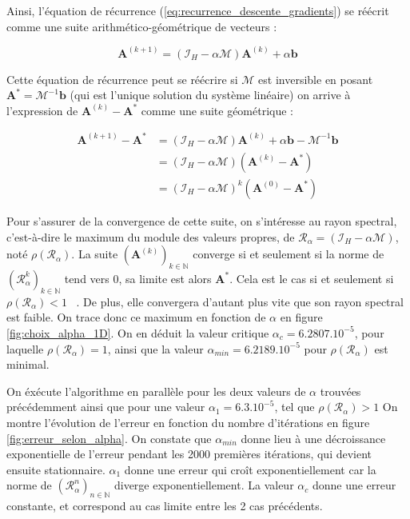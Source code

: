 \documentclass[12pt]{report}
\begin{document}
Ainsi, l'équation de récurrence (\ref{eq:recurrence_descente_gradients}) se réécrit comme une suite arithmético-géométrique de vecteurs :

\begin{equation}
    \bm{A}^{(k+1)} = (\mathcal{I}_H - \alpha \mathcal{M} )  \bm{A}^{(k)} + \alpha\bm{b}
    \label{eq:recurrence_descente_gradients_v2}
\end{equation}

Cette équation de récurrence peut se réécrire si $\mathcal M$ est inversible en posant $\bm{A^*} = \mathcal {M}^{-1}\bm{b}$ (qui est l'unique solution du système linéaire) on arrive à l'expression de $\bm{A}^{(k)}-\bm{A^*} $ comme une suite géométrique :

\begin{equation}
    \begin{aligned}
        \bm{A}^{(k+1)}-\bm{A^*} & = (\mathcal{I}_H - \alpha \mathcal{M} )  \bm{A}^{(k)} + \alpha\bm{b} - \mathcal {M}^{-1}\bm{b} \\
                                & = (\mathcal{I}_H - \alpha \mathcal{M} ) (\bm{A}^{(k)}-\bm{A^*} ) \\
                                & = (\mathcal{I}_H - \alpha \mathcal{M} )^k (\bm{A}^{(0)}-\bm{A^*} )
    \end{aligned}
    \label{eq:recurrence_descente_gradients_2D_v2}
\end{equation}

Pour s'assurer de la convergence de cette suite, on s'intéresse au rayon spectral, c'est-à-dire le maximum du module des valeurs propres, de $\mathcal{R}_\alpha = (\mathcal{I}_H - \alpha \mathcal{M} )$, noté $\rho(\mathcal{R}_\alpha)$.
La suite $(\bm{A}^{(k)})_{k\in \mathbb{N}}$ converge si et seulement si la norme de $(\mathcal{R}_\alpha ^k)_{k\in \mathbb{N}}$ tend vers 0, sa limite est alors $\bm A^*$.
Cela est le cas si et seulement si $\rho(\mathcal{R}_\alpha)<1$ ~\cite{WikiRayonSpectral}.
De plus, elle convergera d'autant plus vite que son rayon spectral est faible.
On trace donc ce maximum en fonction de $\alpha$ en figure \ref{fig:choix_alpha_1D}.
On en déduit la valeur critique $\alpha_c = 6.2807.10^{-5}$, pour laquelle $\rho(\mathcal{R}_\alpha)=1$, ainsi que la valeur $\alpha_{min} = 6.2189.10^{-5}$ pour $\rho(\mathcal{R}_\alpha)$ est minimal.

On éxécute l'algorithme en parallèle pour les deux valeurs de $\alpha$ trouvées précédemment ainsi que pour une valeur $\alpha_1 = 6.3.10^{-5}$, tel que $\rho(\mathcal{R}_\alpha)>1$
On montre l'évolution de l'erreur en fonction du nombre d'itérations en figure \ref{fig:erreur_selon_alpha}.
On constate que $\alpha_{min}$ donne lieu à une décroissance exponentielle de l'erreur pendant les 2000 premières itérations, qui devient ensuite stationnaire.
$\alpha_1$ donne une erreur qui croît exponentiellement car la norme de $(\mathcal{R}_\alpha ^n)_{n\in \mathbb{N}}$ diverge exponentiellement.
La valeur $\alpha_c$ donne une erreur constante, et correspond au cas limite entre les 2 cas précédents.
\end{document}
